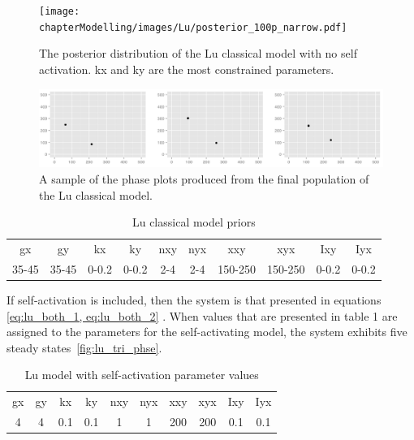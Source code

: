\begin{figure}[p]
\centering
\texttt{[image: chapterModelling/images/Lu/posterior\_100p\_narrow.pdf]}
\caption[The posterior distribution of the Lu classical model with no self activation]{The posterior distribution of the Lu classical model with no self activation. kx and ky are the most constrained parameters.}
\label{fig:lu_bistable}
\end{figure}


\clearpage
\begin{figure}[p]
\centering
\includegraphics[scale=0.4]{chapterModelling/images/Lu/phase_plot.png}
\caption{A sample of the phase plots produced from the final population of the Lu classical model.}
\label{fig:lu_phase}
\end{figure}

\begin{table}[p]
\centering
\caption{Lu classical model priors}
\label{tab:lu}
\begin{tabular}{cccccccccc}
gx    & gy    & kx    & ky    & nxy & nyx & xxy     & xyx     & Ixy   & Iyx \\
35-45 & 35-45 & 0-0.2 & 0-0.2 & 2-4 & 2-4 & 150-250 & 150-250 & 0-0.2 &   0-0.2 
\end{tabular}
\end{table}

If self-activation is included, then the system is that presented in equations \eqref{eq:lu_both_1, eq:lu_both_2} . When values that are presented in table 1 are assigned to the parameters for the self-activating model, the system exhibits five steady states~\ref{fig:lu_tri_phse}. 

\clearpage
\begin{table}[p]
\centering
\caption{Lu model with self-activation parameter values}
\label{tab:lu_dp_tri}
\begin{tabular}{cccccccccc}
gx    & gy    & kx    & ky    & nxy & nyx & xxy     & xyx     & Ixy   & Iyx \\
4&4     &0.1   & 0.1   &  1  &  1  &  200    &  200    & 0.1    &   0.1
\end{tabular}
\end{table}


